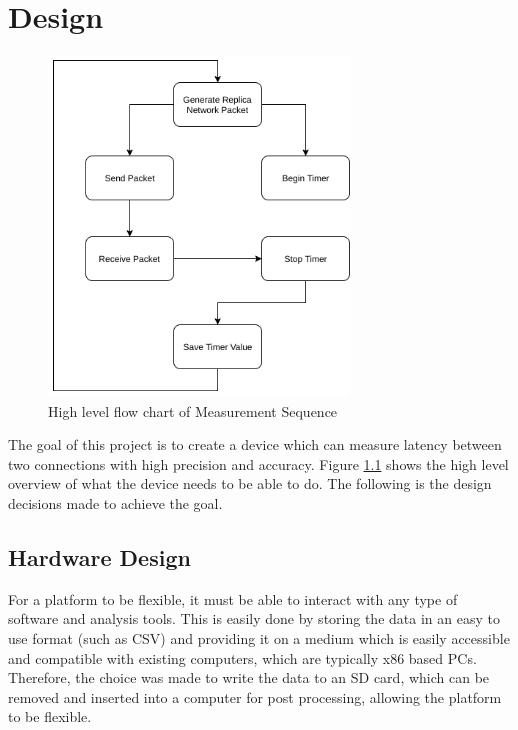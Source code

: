 \chapter{Design}\label{C:design}

\vspace{-3mm}

\begin{figure}[H]
    \begin{center}
        \includegraphics[keepaspectratio,width=8cm]{Images/MeasurementSequence}
        \caption{High level flow chart of Measurement Sequence}
        \label{fig:measurementsequence}
    \end{center}
\end{figure}


The goal of this project is to create a device which can measure latency between two connections with high precision
and accuracy. Figure \ref{fig:measurementsequence} shows the high level overview of what the device needs to be able 
to do. The following is the design decisions made to achieve the goal.

\section{Hardware Design}

For a platform to be flexible, it must be able to interact with any type of software and analysis tools. This is 
easily done by storing the data in an easy to use format (such as CSV) and providing it on a medium which is 
easily accessible and compatible with existing computers, which are typically x86 based PCs. Therefore, the choice 
was made to write the data to an SD card, which can be removed and inserted into a computer for post processing, 
allowing the platform to be flexible. 

